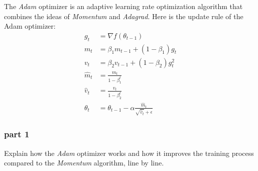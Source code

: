 The \textit{Adam} optimizer is an adaptive learning rate optimization algorithm that combines the ideas of \textit{Momentum} and \textit{Adagrad}. Here is the update rule of the Adam optimizer:
\[
\begin{aligned}
g_t &= \nabla f(\theta_{t-1}) \\
m_t &= \beta_1 m_{t-1} + (1 - \beta_1) g_t \\
v_t &= \beta_2 v_{t-1} + (1 - \beta_2) g_t^2 \\
\hat{m}_t &= \frac{m_t}{1 - \beta_1^t} \\
\hat{v}_t &= \frac{v_t}{1 - \beta_2^t} \\
\theta_t &= \theta_{t-1} - \alpha \frac{\hat{m}_t}{\sqrt{\hat{v}_t} + \epsilon}
\end{aligned}
\]

\subsubsection{part 1}
Explain how the \textit{Adam} optimizer works and how it improves the training process compared to the \textit{Momentum} algorithm, line by line.
